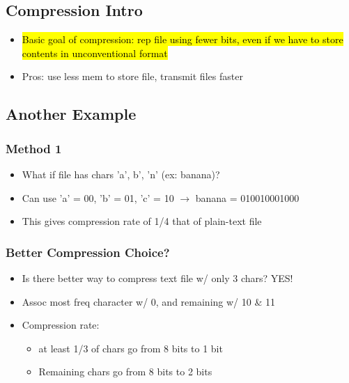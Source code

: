 \documentclass{article}
\begin{document}
\begin{multicols}{2}
\subsection{Compression Intro}
        \begin{itemize}
            \item \hl{Basic goal of compression: rep file using fewer bits, even if we have to store contents in unconventional format}
            \item Pros: use less mem to store file, transmit files faster
        \end{itemize}

\subsection{Another Example}

\subsubsection{Method 1}
        \begin{itemize}
            \item What if file has chars 'a', b', 'n' (ex: banana)?
            \item Can use 'a' = 00, 'b' = 01, 'c' = 10 $\rightarrow$ banana = 010010001000
            \item This gives compression rate of 1/4 that of plain-text file
        \end{itemize}

\subsubsection{Better Compression Choice?}
        \begin{itemize}
            \item Is there better way to compress text file w/ only 3 chars? YES!
            \item Assoc most freq character w/ 0, and remaining w/ 10 \& 11
            \item Compression rate:
                \begin{itemize}
                    \item at least 1/3 of chars go from 8 bits to 1 bit
                    \item Remaining chars go from 8 bits to 2 bits
                \end{itemize}
        \end{itemize}


\end{multicols}
\end{document}
